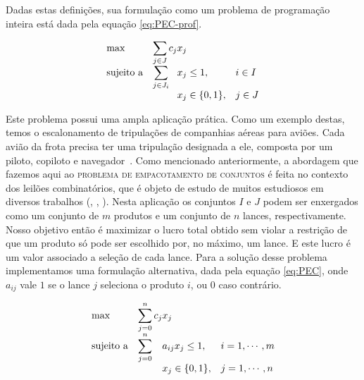 \documentclass{article}
\begin{document}
	
	Dadas estas definições, sua formulação como um problema de programação inteira está dada pela equação \ref{eq:PEC-prof}.
	
	\begin{equation}
		\label{eq:PEC-prof}
        \begin{array}{ll@{}ll}
            \text{max}  & \displaystyle\sum\limits_{j \in J} c_{j}&x_{j} &\\
            \text{sujeito a}& \displaystyle\sum\limits_{j \in J_i}   &x_{j} \leq 1,  &i \in I\\
                 &                                                &x_{j} \in \{0,1\}, &j \in J
        \end{array}
    \end{equation}
    
	Este problema possui uma ampla aplicação prática. Como um exemplo destas, temos o escalonamento de tripulações de companhias aéreas para aviões. Cada avião da frota precisa ter uma tripulação designada a ele, composta por um piloto, copiloto e navegador~\cite{Airline}.    
    Como mencionado anteriormente, a abordagem que fazemos aqui ao \textsc{problema de empacotamento de conjuntos} é feita no contexto dos leilões combinatórios, que é objeto de estudo de muitos estudiosos em diversos trabalhos (\cite{Winner}, \cite{Taming}, \cite{CABOB}). Nesta aplicação os conjuntos $I$ e $J$ podem ser enxergados como um conjunto de $m$ produtos e um conjunto de $n$ lances, respectivamente. Nosso objetivo então é maximizar o lucro total obtido sem violar a restrição de que um produto só pode ser escolhido por, no máximo, um lance. E este lucro é um valor associado a seleção de cada lance. 
    Para a solução desse problema implementamos uma formulação alternativa, dada pela equação \ref{eq:PEC}, onde $ a_{ij} $ vale $ 1 $ se o lance $ j $ seleciona o produto $ i $, ou $ 0 $ caso contrário.
    
    \begin{equation}
    	\label{eq:PEC}
    	\begin{array}{ll@{}ll}
    		\text{max}  & \displaystyle\sum\limits_{j = 0}^{n} c_{j} & x_{j} &\\
    		\text{sujeito a}& \displaystyle\sum\limits_{j = 0}^{n}   & a_{ij}x_{j} \leq 1,  & i=1,\cdots,m\\
    		&                                                &x_{j} \in \{0,1\}, & j = 1,\cdots,n
    	\end{array}
    \end{equation}
    
\end{document}
